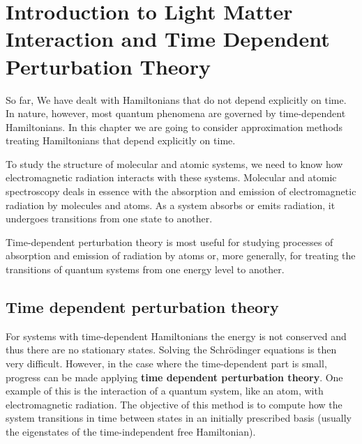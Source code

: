 \section{Introduction to Light Matter Interaction and Time Dependent Perturbation Theory}

So far, We have dealt with Hamiltonians that do not depend explicitly on time. In nature, however, most quantum phenomena are governed by time-dependent Hamiltonians. In this chapter we are going to consider approximation methods treating Hamiltonians that depend explicitly on time.

To study the structure of molecular and atomic systems, we need to know how electromagnetic radiation interacts with these systems. Molecular and atomic spectroscopy deals in essence with the absorption and emission of electromagnetic radiation by molecules and atoms. As a system absorbs or emits radiation, it undergoes transitions from one state to another. 

Time-dependent perturbation theory is most useful for studying processes of absorption and emission of radiation by atoms or, more generally, for treating the transitions of quantum systems from one energy level to another.

\subsection{Time dependent perturbation theory}

For systems with time-dependent Hamiltonians the energy is not conserved and thus there are no stationary states. Solving the Schrödinger equations is then very difficult. However, in the case where the time-dependent part is small, progress can be made applying \textbf{time dependent perturbation theory}. One example of this is the interaction of a quantum system, like an atom, with electromagnetic radiation. The objective of this method is to compute how the system transitions in time between states in an initially prescribed basis (usually the eigenstates of the time-independent free Hamiltonian).

